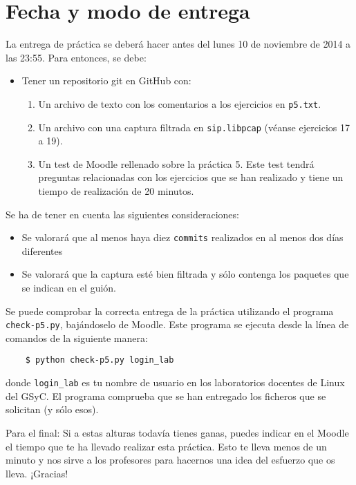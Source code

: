 \documentclass[11pt,a4paper]{article}
\begin{document}
\section{Fecha y modo de entrega}

La entrega de práctica se deberá hacer antes del lunes 10 de noviembre de 2014 a las 23:55. Para entonces, se debe: 

\begin{itemize}
  \item Tener un repositorio git en GitHub con:
  \begin{enumerate}
    \item Un archivo de texto con los comentarios a los ejercicios en \texttt{p5.txt}.
    \item Un archivo con una captura filtrada en \texttt{sip.libpcap} (véanse ejercicios 17 a 19).
    \item Un test de Moodle rellenado sobre la práctica 5. Este test tendrá preguntas relacionadas con los ejercicios que se han realizado y tiene un tiempo de realización de 20 minutos.
  \end{enumerate}
\end{itemize}

Se ha de tener en cuenta las siguientes consideraciones:
\begin{itemize}
  \item Se valorará que al menos haya diez \texttt{commits} realizados en al menos dos días diferentes
  \item Se valorará que la captura esté bien filtrada y sólo contenga los paquetes que se indican en el guión.
\end{itemize}

Se puede comprobar la correcta entrega de la práctica utilizando el programa \texttt{check-p5.py}, bajándoselo de Moodle. Este programa se ejecuta desde la línea de comandos de la siguiente manera:
\begin{verbatim}
	$ python check-p5.py login_lab
\end{verbatim}


donde \texttt{login\_lab} es tu nombre de usuario en los laboratorios docentes de Linux del GSyC. El programa comprueba que se han entregado los ficheros que se solicitan (y sólo esos).


\vspace{1cm}

\footnotesize{Para el final: Si a estas alturas todavía tienes ganas, puedes indicar en el Moodle el tiempo que te ha llevado realizar esta práctica. Esto te lleva menos de un minuto y nos sirve a los profesores para hacernos una idea del esfuerzo que os lleva. ¡Gracias!}
\end{document}
